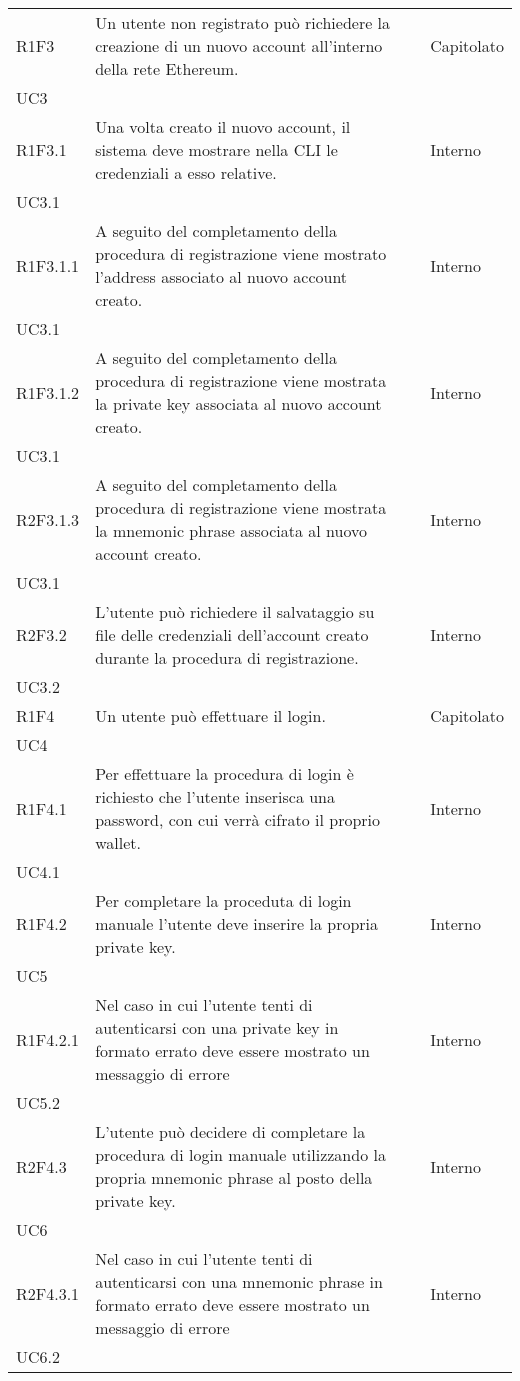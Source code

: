 \begin{longtable}{ 
		>{\centering}p{} 
		>{}p{} 
		>{\centering}p{}
		>{\centering}p{} }
	R1F3 & Un utente non registrato può richiedere la creazione di un nuovo account
			 all'interno della rete Ethereum\ped{\textit{G}}.						& \ob & Capitolato \\ UC3 \tabularnewline
	R1F3.1 & Una volta creato il nuovo account, il sistema deve mostrare nella 
			CLI\ped{\textit{G}} le credenziali a esso relative.										& \ob & Interno \\ UC3.1 \tabularnewline
	R1F3.1.1 & A seguito del completamento della procedura di registrazione viene
			mostrato l'address associato al nuovo account creato. 					& \ob & Interno \\ UC3.1 \tabularnewline
	R1F3.1.2 & A seguito del completamento della procedura di registrazione viene
			mostrata la private key\ped{\textit{G}} associata al nuovo account creato. 				& \ob & Interno \\ UC3.1 \tabularnewline
	R2F3.1.3 & A seguito del completamento della procedura di registrazione viene
			mostrata la mnemonic phrase\ped{\textit{G}} associata al nuovo account creato. 			& \de & Interno \\ UC3.1 \tabularnewline
	R2F3.2 & L'utente può richiedere il salvataggio su file delle credenziali 
			dell'account creato durante la procedura di registrazione.				& \de & Interno \\ UC3.2 \tabularnewline

	R1F4 & Un utente può effettuare il login. 										& \ob & Capitolato \\ UC4 \tabularnewline
	R1F4.1 & Per effettuare la procedura di login è richiesto che l'utente inserisca una 
		password, con cui verrà cifrato il proprio wallet. 							& \ob & Interno \\ UC4.1 \tabularnewline
	R1F4.2 & Per completare la proceduta di login manuale l'utente deve inserire
			 la propria private key\ped{\textit{G}}. 								& \ob & Interno \\ UC5 \tabularnewline
	R1F4.2.1 & Nel caso in cui l'utente tenti di autenticarsi con una private key in formato errato 
		deve essere mostrato un messaggio di errore 								& \ob & Interno \\ UC5.2 \tabularnewline
	R2F4.3 & L'utente può decidere di completare la procedura di login manuale 
			 utilizzando la propria mnemonic phrase\ped{\textit{G}} al posto della private key.		& \de & Interno \\ UC6 \tabularnewline
 	R2F4.3.1 & Nel caso in cui l'utente tenti di autenticarsi con una mnemonic phrase in formato errato 
 	deve essere mostrato un messaggio di errore 								& \ob & Interno \\ UC6.2 \tabularnewline
	

\end{longtable}
